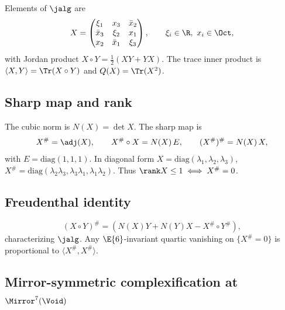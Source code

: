 Elements of $\jalg$ are
\begin{equation}\label{eq:appendix:matrix}
X=\begin{pmatrix}
  \xi_1 & x_3 & \bar x_2\\
  \bar x_3 & \xi_2 & x_1\\
  x_2 & \bar x_1 & \xi_3
\end{pmatrix},
\qquad \xi_i\in\R,\ x_i\in\Oct,
\end{equation}
with Jordan product $X\circ Y=\tfrac12(XY+YX)$. The trace inner product is
$\langle X,Y\rangle=\Tr(X\circ Y)$ and $Q(X)=\Tr(X^2)$.

\subsection{Sharp map and rank}
\label{sec:appendix:sharp}

The cubic norm is $N(X)=\det X$. The sharp map is
\begin{equation}\label{eq:appendix:sharp}
X^{\#}=\adj(X),\qquad X^{\#}\circ X=N(X)\,E,\qquad (X^{\#})^{\#}=N(X)\,X,
\end{equation}
with $E=\mathrm{diag}(1,1,1)$. In diagonal form
$X=\mathrm{diag}(\lambda_1,\lambda_2,\lambda_3)$,
$X^{\#}=\mathrm{diag}(\lambda_2\lambda_3,\lambda_3\lambda_1,\lambda_1\lambda_2)$.
Thus $\rank X\leq1\iff X^{\#}=0$.

\subsection{Freudenthal identity}
\label{sec:appendix:freudenthal}

\begin{equation}
  (X\circ Y)^{\#}=(N(X)Y+N(Y)X-X^{\#}\circ Y^{\#}),
\end{equation}
characterizing $\jalg$. Any $\E{6}$-invariant quartic vanishing on
$\{X^{\#}=0\}$ is proportional to $\langle X^{\#},X^{\#}\rangle$.

\subsection{Mirror-symmetric complexification at $\Mirror^7(\Void)$}
\label{sec:appendix:mirror-quotient}

